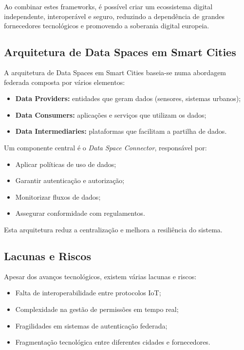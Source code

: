 \documentclass[a4paper]{article}
\begin{document}
Ao combinar estes frameworks, é possível criar um ecossistema digital independente, interoperável e seguro, reduzindo a 
dependência de grandes fornecedores tecnológicos e promovendo a soberania digital europeia.

\subsection{Arquitetura de Data Spaces em Smart Cities}
A arquitetura de Data Spaces em Smart Cities baseia-se numa abordagem federada composta por vários elementos:

\begin{itemize}
    \item \textbf{Data Providers:} entidades que geram dados (sensores, sistemas urbanos);
    \item \textbf{Data Consumers:} aplicações e serviços que utilizam os dados;
    \item \textbf{Data Intermediaries:} plataformas que facilitam a partilha de dados.
\end{itemize}
\newpage
Um componente central é o \textit{Data Space Connector}, responsável por:
\begin{itemize}
    \item Aplicar políticas de uso de dados;
    \item Garantir autenticação e autorização;
    \item Monitorizar fluxos de dados;
    \item Assegurar conformidade com regulamentos.
\end{itemize}

Esta arquitetura reduz a centralização e melhora a resiliência do sistema.


\subsection{Lacunas e Riscos}\label{lacunaseriscos}
Apesar dos avanços tecnológicos, existem várias lacunas e riscos:

\begin{itemize}
    \item Falta de interoperabilidade entre protocolos IoT;
    \item Complexidade na gestão de permissões em tempo real;
    \item Fragilidades em sistemas de autenticação federada;
    \item Fragmentação tecnológica entre diferentes cidades e fornecedores.
\end{itemize}
\end{document}
